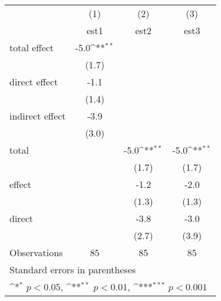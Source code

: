 {
\def\sym#1{\ifmmode^{#1}\else\(^{#1}\)\fi}
\begin{tabular}{l*{3}{c}}
\hline\hline
                &\multicolumn{1}{c}{(1)}         &\multicolumn{1}{c}{(2)}         &\multicolumn{1}{c}{(3)}         \\
                &     est1         &     est2         &     est3         \\
\hline
total effect       &     -5.0\sym{**} &                  &                  \\
                &    (1.7)         &                  &                  \\
direct effect      &     -1.1         &                  &                  \\
                &    (1.4)         &                  &                  \\
indirect effect    &     -3.9         &                  &                  \\
                &    (3.0)         &                  &                  \\
total           &                  &     -5.0\sym{**} &     -5.0\sym{**} \\
                &                  &    (1.7)         &    (1.7)         \\
effect          &                  &     -1.2         &     -2.0         \\
                &                  &    (1.3)         &    (1.3)         \\
direct          &                  &     -3.8         &     -3.0         \\
                &                  &    (2.7)         &    (3.9)         \\
\hline
Observations    &       85         &       85         &       85         \\
\hline\hline
\multicolumn{4}{l}{\footnotesize Standard errors in parentheses}\\
\multicolumn{4}{l}{\footnotesize \sym{*} \(p<0.05\), \sym{**} \(p<0.01\), \sym{***} \(p<0.001\)}\\
\end{tabular}
}
